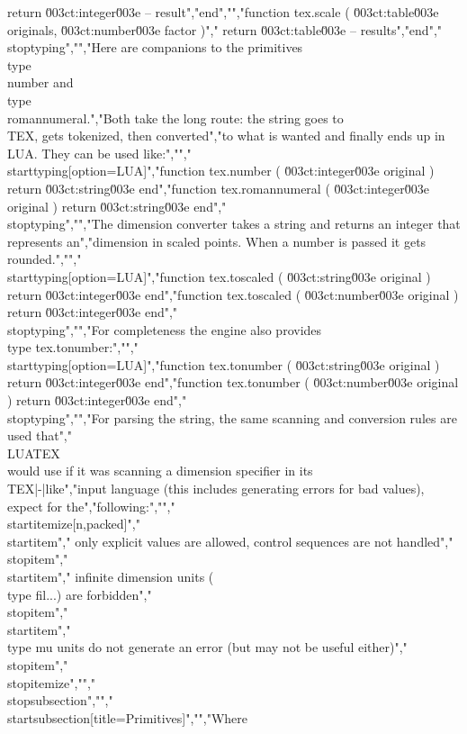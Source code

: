 return \u003ct:integer\u003e -- result","end","","function tex.scale ( \u003ct:table\u003e originals, \u003ct:number\u003e factor )","    return \u003ct:table\u003e -- results","end","\\stoptyping","","Here are companions to the primitives \\type {\\number} and \\type {\\romannumeral}.","Both take the long route: the string goes to \\TEX, gets tokenized, then converted","to what is wanted and finally ends up in \\LUA. They can be used like:","","\\starttyping[option=LUA]","function tex.number       ( \u003ct:integer\u003e original ) return \u003ct:string\u003e end","function tex.romannumeral ( \u003ct:integer\u003e original ) return \u003ct:string\u003e end","\\stoptyping","","The dimension converter takes a string and returns an integer that represents an","dimension in scaled points. When a number is passed it gets rounded.","","\\starttyping[option=LUA]","function tex.toscaled ( \u003ct:string\u003e original ) return \u003ct:integer\u003e end","function tex.toscaled ( \u003ct:number\u003e original ) return \u003ct:integer\u003e end","\\stoptyping","","For completeness the engine also provides \\type {tex.tonumber}:","","\\starttyping[option=LUA]","function tex.tonumber ( \u003ct:string\u003e original ) return \u003ct:integer\u003e end","function tex.tonumber ( \u003ct:number\u003e original ) return \u003ct:integer\u003e end","\\stoptyping","","For parsing the string, the same scanning and conversion rules are used that","\\LUATEX\\ would use if it was scanning a dimension specifier in its \\TEX|-|like","input language (this includes generating errors for bad values), expect for the","following:","","\\startitemize[n,packed]","\\startitem","    only explicit values are allowed, control sequences are not handled","\\stopitem","\\startitem","    infinite dimension units (\\type {fil...}) are forbidden","\\stopitem","\\startitem","    \\type {mu} units do not generate an error (but may not be useful either)","\\stopitem","\\stopitemize","","\\stopsubsection","","\\startsubsection[title={Primitives}]","","Where 
